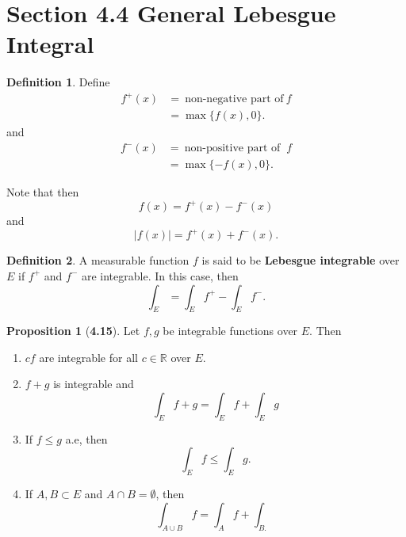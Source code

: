 \documentclass[12pt]{article}
\newcommand{\R}{\mathbb{R}}
\theoremstyle{definition}
\newtheorem*{definition}{Definition}
\newtheorem*{prop}{Proposition}
\begin{document}
\section*{Section 4.4 General Lebesgue Integral}

\begin{definition}

    Define 
        \begin{align*}
            f^{+}(x) &= \ \text{non-negative part of} \ f  \\
                     &= \max \{ f(x), 0 \}.
        \end{align*}
    and 
        \begin{align*}
            f^{-}(x) &= \ \text{non-positive part of } \ f \\
                     &= \max \{ -f(x), 0 \}. 
        \end{align*}
    
\end{definition}

Note that then \[ f(x) = f^{+}(x) - f^{-}(x) \] and 
    \[
        |f(x)| = f^{+}(x) + f^{-}(x).
    \]

\begin{definition}
    A measurable function \( f \) is said to be \textbf{ Lebesgue integrable} over \( E \) if \( f^+ \) and \( f^- \) are integrable. In this case, then 
        \[
            \int_{E} = \int_{E} f^+ - \int_{E} f^{-}.
        \]
\end{definition}

\begin{prop}[\textbf{4.15}]

    Let \( f, g \) be integrable functions over \( E \). Then 
        \begin{enumerate}[label = \roman{*}.]
            \item  \( cf \) are integrable for all \( c \in \R \) over \( E \).
            \item \( f + g \) is integrable and 
                \[
                    \int_{E} f + g = \int_{E} f + \int_{E} g  
                \]
            \item If \( f \leq g \) a.e, then 
                \[
                    \int_{E} f \leq \int_{E} g.  
                \]
            \item If \( A, B \subset E \) and \( A \cap B = \emptyset \), then 
                \[
                    \int_{A \cup B} f = \int_{A} f + \int_{B.}  
                \]
        \end{enumerate}

\end{prop}
\end{document}
